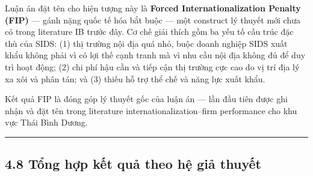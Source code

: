 \documentclass[12pt,a4paper]{article}
\begin{document}
Luận án đặt tên cho hiện tượng này là \textbf{Forced
Internationalization Penalty (FIP)} --- gánh nặng quốc tế hóa bắt buộc
--- một construct lý thuyết mới chưa có trong literature IB trước đây.
Cơ chế giải thích gồm ba yếu tố cấu trúc đặc thù của SIDS: (1) thị
trường nội địa quá nhỏ, buộc doanh nghiệp SIDS xuất khẩu không phải vì
có lợi thế cạnh tranh mà vì nhu cầu nội địa không đủ để duy trì hoạt
động; (2) chi phí hậu cần và tiếp cận thị trường cực cao do vị trí địa
lý xa xôi và phân tán; và (3) thiếu hỗ trợ thể chế và năng lực xuất
khẩu.

Kết quả FIP là đóng góp lý thuyết gốc của luận án --- lần đầu tiên được
ghi nhận và đặt tên trong literature internationalization--firm
performance cho khu vực Thái Bình Dương.

\begin{center}\rule{0.5\linewidth}{0.5pt}\end{center}

\hypertarget{48-tux1ed5ng-hux1ee3p-kux1ebft-quux1ea3-theo-hux1ec7-giux1ea3-thuyux1ebft}{%
\subsection{4.8 Tổng hợp kết quả theo hệ giả
thuyết}\label{48-tux1ed5ng-hux1ee3p-kux1ebft-quux1ea3-theo-hux1ec7-giux1ea3-thuyux1ebft}}
\end{document}
